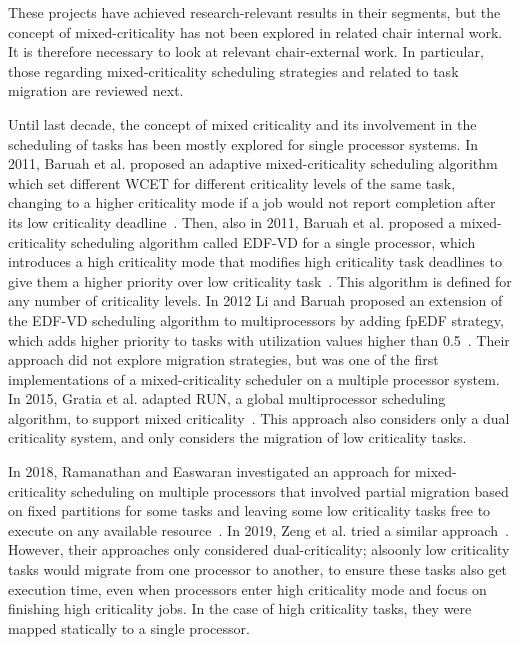 These projects have achieved research-relevant results in their segments, but the concept of mixed-criticality has not been explored in related chair internal work. It is therefore necessary to look at relevant chair-external work. In particular, those regarding mixed-criticality scheduling strategies and related to task migration are reviewed next.

Until last decade, the concept of mixed criticality and its involvement in the scheduling of tasks has been mostly explored for single processor systems. In 2011, Baruah et al. proposed an adaptive mixed-criticality scheduling algorithm which set different WCET for different criticality levels of the same task, changing to a higher criticality mode if a job would not report completion after its low criticality deadline~\parencite{baruah2}. Then, also in 2011, Baruah et al. proposed a mixed-criticality scheduling algorithm called EDF-VD for a single processor, which introduces a high criticality mode that modifies high criticality task deadlines to give them a higher priority over low criticality task~\parencite{baruah1}. This algorithm is defined for any number of criticality levels. In 2012 Li and Baruah proposed an extension of the EDF-VD scheduling algorithm to multiprocessors by adding fpEDF strategy, which adds higher priority to tasks with utilization values higher than 0.5~\parencite{libaruah1}. Their approach did not explore migration strategies, but was one of the first implementations of a mixed-criticality scheduler on a multiple processor system. In 2015, Gratia et al. adapted RUN, a global multiprocessor scheduling algorithm, to support mixed criticality~\parencite{gratia1}. This approach also considers only a dual criticality system, and only considers the migration of low criticality tasks.

In 2018, Ramanathan and Easwaran investigated an approach for mixed-criticality scheduling on multiple processors that involved partial migration based on fixed partitions for some tasks and leaving some low criticality tasks free to execute on any available resource~\parencite{ramanathan1}. In 2019, Zeng et al. tried a similar approach~\parencite{zeng1}. However, their approaches only considered dual-criticality; alsoonly low criticality tasks would migrate from one processor to another, to ensure these tasks also get execution time, even when processors enter high criticality mode and focus on finishing high criticality jobs. In the case of high criticality tasks, they were mapped statically to a single processor.


